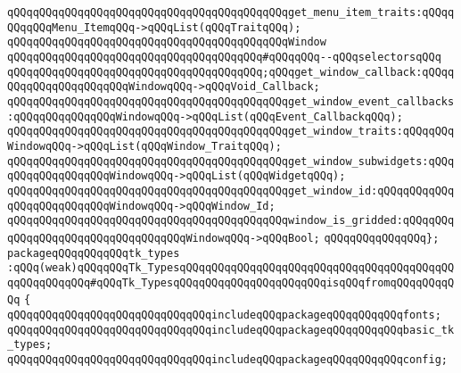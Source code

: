 \verb|qQQqqQQqqQQqqQQqqQQqqQQqqQQqqQQqqQQqqQQqqQQqget_menu_item_traits:qQQqqQQqqQQqMenu_ItemqQQq->qQQqList(qQQqTraitqQQq);|\newline
\newline
\verb|qQQqqQQqqQQqqQQqqQQqqQQqqQQqqQQqqQQqqQQqqQQqWindow|\newline
\newline
\verb|qQQqqQQqqQQqqQQqqQQqqQQqqQQqqQQqqQQqqQQq#qQQqqQQq--qQQqselectorsqQQq|\newline
\verb|qQQqqQQqqQQqqQQqqQQqqQQqqQQqqQQqqQQqqQQq;qQQqget_window_callback:qQQqqQQqqQQqqQQqqQQqqQQqWindowqQQq->qQQqVoid_Callback;|\newline
\verb|qQQqqQQqqQQqqQQqqQQqqQQqqQQqqQQqqQQqqQQqqQQqget_window_event_callbacks:qQQqqQQqqQQqqQQqWindowqQQq->qQQqList(qQQqEvent_CallbackqQQq);|\newline
\verb|qQQqqQQqqQQqqQQqqQQqqQQqqQQqqQQqqQQqqQQqqQQqget_window_traits:qQQqqQQqWindowqQQq->qQQqList(qQQqWindow_TraitqQQq);|\newline
\verb|qQQqqQQqqQQqqQQqqQQqqQQqqQQqqQQqqQQqqQQqqQQqget_window_subwidgets:qQQqqQQqqQQqqQQqqQQqWindowqQQq->qQQqList(qQQqWidgetqQQq);|\newline
\verb|qQQqqQQqqQQqqQQqqQQqqQQqqQQqqQQqqQQqqQQqqQQqget_window_id:qQQqqQQqqQQqqQQqqQQqqQQqqQQqWindowqQQq->qQQqWindow_Id;|\newline
\verb|qQQqqQQqqQQqqQQqqQQqqQQqqQQqqQQqqQQqqQQqqQQqwindow_is_gridded:qQQqqQQqqQQqqQQqqQQqqQQqqQQqqQQqqQQqWindowqQQq->qQQqBool;|\newline
\newline
\verb|qQQqqQQqqQQqqQQq};|\newline
\newline
\newline
\newline
\verb|packageqQQqqQQqqQQqtk_types|\newline
\verb|:qQQq(weak)qQQqqQQqTk_TypesqQQqqQQqqQQqqQQqqQQqqQQqqQQqqQQqqQQqqQQqqQQqqQQqqQQqqQQq#qQQqTk_TypesqQQqqQQqqQQqqQQqqQQqqQQqisqQQqfromqQQqqQQqqQQq|\newline
\verb|{|\newline
\verb|qQQqqQQqqQQqqQQqqQQqqQQqqQQqqQQqincludeqQQqpackageqQQqqQQqqQQqfonts;|\newline
\verb|qQQqqQQqqQQqqQQqqQQqqQQqqQQqqQQqincludeqQQqpackageqQQqqQQqqQQqbasic_tk_types;|\newline
\verb|qQQqqQQqqQQqqQQqqQQqqQQqqQQqqQQqincludeqQQqpackageqQQqqQQqqQQqconfig;|\newline
